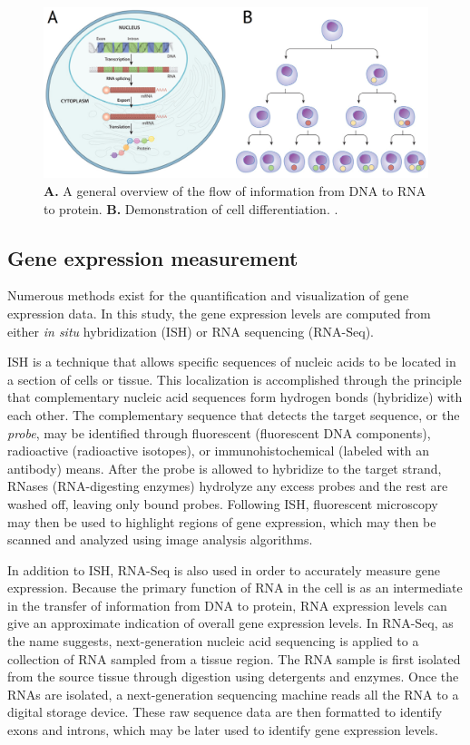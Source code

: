 \documentclass[12pt,oneside,onecolumn,a4paper]{article}
\begin{document}
\begin{figure}[h!]
\begin{center}
\includegraphics[width=0.8\columnwidth]{figures/Untitled/Untitled}
\caption{\textbf{A.} A general overview of the flow of information from DNA to RNA to protein. \textbf{B.} Demonstration of cell differentiation. \citep{bisceglia_2010}.%
}
\end{center}
\end{figure}

\subsection{Gene expression measurement}
Numerous methods exist for the quantification and visualization of gene expression data. In this study, the gene expression levels are computed from either \textit{in situ} hybridization (ISH) or RNA sequencing (RNA-Seq). 

ISH is a technique that allows specific sequences of nucleic acids to be located in a section of cells or tissue. This localization is accomplished through the principle that complementary nucleic acid sequences form hydrogen bonds (hybridize) with each other. The complementary sequence that detects the target sequence, or the \textit{probe}, may be identified through fluorescent (fluorescent DNA components), radioactive (radioactive isotopes), or immunohistochemical (labeled with an antibody) means. After the probe is allowed to hybridize to the target strand, RNases (RNA-digesting enzymes) hydrolyze any excess probes and the rest are washed off, leaving only bound probes. Following ISH, fluorescent microscopy may then be used to highlight regions of gene expression, which may then be scanned and analyzed using image analysis algorithms. \citep{Angerer_1991}

In addition to ISH, RNA-Seq is also used in order to accurately measure gene expression. Because the primary function of RNA in the cell is as an intermediate in the transfer of information from DNA to protein, RNA expression levels can give an approximate indication of overall gene expression levels. In RNA-Seq, as the name suggests, next-generation nucleic acid sequencing is applied to a collection of RNA sampled from a tissue region. The RNA sample is first isolated from the source tissue through digestion using detergents and enzymes. Once the RNAs are isolated, a next-generation sequencing machine reads all the RNA to a digital storage device. These raw sequence data are then formatted to identify exons and introns, which may be later used to identify gene expression levels. 
\citep{Wang_2009}
\end{document}
